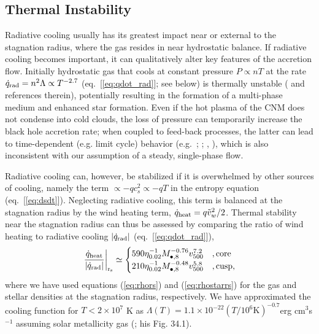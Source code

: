 \documentclass[usenatbib,fleqn]{mn2e}
\begin{document}
\subsection{Thermal Instability}
\label{sec:instability}

Radiative cooling usually has its greatest impact near or external to the stagnation radius, where the gas resides in near hydrostatic balance.  If radiative cooling becomes important, it can qualitatively alter key features of the accretion flow. Initially hydrostatic gas that cools at constant pressure $P \propto nT$ at the rate $\dot{q}_{\rm rad} = n^{2}\Lambda \propto T^{-2.7}$ (eq.~[\ref{eq:qdot_rad}]; see below) is thermally unstable (\citealt{McCourt+12} and references therein), potentially resulting in the formation of a multi-phase medium and enhanced star formation.  Even if the hot plasma of the CNM does not condense into cold clouds, the loss of pressure can temporarily increase the black hole accretion rate; when coupled to feed-back processes, the latter can lead to time-dependent (e.g. limit cycle) behavior (e.g.~\citealt{Ciotti&Ostriker07}; \citealt{Ciotti+10}; \citealt{Yuan&Li11}, \citealt{Gan+14}), which is also inconsistent with our assumption of a steady, single-phase flow.  

Radiative cooling can, however, be stabilized if it is overwhelmed by other sources of cooling, namely the term $\propto -q c_{s}^{2} \propto -qT$ in the entropy equation (eq.~[\ref{eq:dsdt}]).  Neglecting radiative cooling, this term is balanced at the stagnation radius by the wind heating term, $\dot{q}_{\rm heat} = q \tilde{v}_{w}^{2}/2$.  Thermal stability near the stagnation radius can thus be assessed by comparing the ratio of wind heating to radiative cooling $|\dot{q}_{\rm rad}|$ (eq.~[\ref{eq:qdot_rad}]),
\begin{align}
\left.\frac{\dot{q}_{\rm heat}}{|\dot{q}_{\rm rad}|}\right|_{\rm r_{\rm s}} \simeq
  \begin{cases}
   590 \eta_{0.02}^{-1} M_{\bullet,8}^{-0.76}v_{500}^{7.2}  &, \text{core}\\
   210 \eta_{0.02}^{-1} M_{\bullet,8}^{-0.48}v_{500}^{5.8}  &, \text{cusp},     
  \end{cases}
  \label{eq:cooling2}
\end{align}
where we have used equations (\ref{eq:rhors}) and (\ref{eq:rhostarrs}) for the gas and stellar densities at the stagnation radius, respectively.  We have approximated the cooling function for $T < 2\times 10^{7}$ K as $\Lambda(T) = 1.1 \times 10^{-22} \left(T/10^6 \text{K}\right)^{-0.7}  $erg cm$^3 $s$^{-1}$ assuming solar metallicity gas (\citealt{Draine:2011a}; his Fig. 34.1).  
\end{document}
